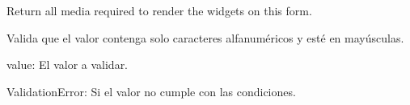 \documentclass[letterpaper,10pt,spanish]{sphinxmanual}
\begin{document}
\begin{fulllineitems}
\begin{fulllineitems}

\pysigstartsignatures
{}
\pysigstopsignatures
\end{fulllineitems}



\begin{fulllineitems}

\pysigstartsignatures
{}
\pysigstopsignatures
\sphinxAtStartPar
Return all media required to render the widgets on this form.

\end{fulllineitems}


\end{fulllineitems}



\begin{fulllineitems}

\pysigstartsignatures
{}
\pysigstopsignatures
\sphinxAtStartPar
Valida que el valor contenga solo caracteres alfanuméricos y esté en mayúsculas.
\begin{description}
\sphinxAtStartPar
value: El valor a validar.

\sphinxAtStartPar
ValidationError: Si el valor no cumple con las condiciones.

\end{description}

\end{fulllineitems}
\end{document}
